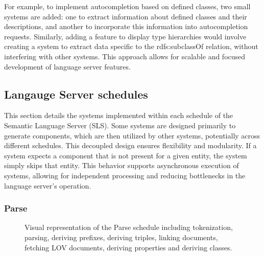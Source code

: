 For example, to implement autocompletion based on defined classes, two small systems are added:
  one to extract information about defined classes and their descriptions,
  and another to incorporate this information into autocompletion requests. 
Similarly, adding a feature to display type hierarchies would involve creating a system to extract data specific to the rdfs:subclassOf relation, without interfering with other systems.
This approach allows for scalable and focused development of language server features.


\subsection{Langauge Server schedules}

This section details the systems implemented within each schedule of the Semantic Language Server (SLS).
Some systems are designed primarily to generate components, which are then utilized by other systems, potentially across different schedules.
This decoupled design ensures flexibility and modularity. 
If a system expects a component that is not present for a given entity, the system simply skips that entity.
This behavior supports asynchronous execution of systems, allowing for independent processing and reducing bottlenecks in the language server’s operation.

\subsubsection{Parse}

\begin{figure}[tb]
 \centering
  \caption{Visual representation of the Parse schedule including tokenization, parsing, deriving prefixes, deriving triples, linking documents, fetching LOV documents, deriving properties and deriving classes. }\label{fig:Parse}
\end{figure}

